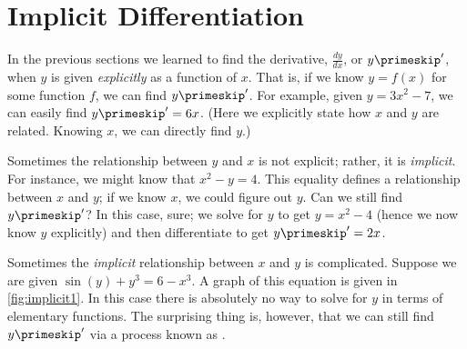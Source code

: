 \section{Implicit Differentiation}\label{sec:imp_deriv}

In the previous sections we learned to find the derivative, $ \frac{dy}{dx}$, or $y\primeskip'$, when $y$ is given \textit{explicitly} as a function of $x$. That is, if we know $y=f(x)$ for some function $f$, we can find $y\primeskip'$. For example, given  $y=3x^2-7$, we can easily find $y\primeskip'=6x$. (Here we explicitly state how $x$ and $y$ are related. Knowing $x$, we can directly find $y$.)

Sometimes the relationship between $y$ and $x$ is not explicit; rather, it is \textit{implicit}. For instance, we might know that $x^2-y=4$. This equality defines a relationship between $x$ and $y$; if we know $x$, we could figure out $y$. Can we still find $y\primeskip'$?  In this case, sure; we  solve for $y$ to get $y=x^2-4$ (hence we now know $y$ explicitly)  and then differentiate to get $y\primeskip'=2x$.

Sometimes the \textit{implicit} relationship between $x$ and $y$ is complicated.  Suppose we are given $\sin(y)+y^3=6-x^3$. A graph of this equation is given in \autoref{fig:implicit1}. In this case there is absolutely no way to solve for $y$ in terms of elementary functions.  The surprising thing is, however, that we can still find $y\primeskip'$ via a process known as .


